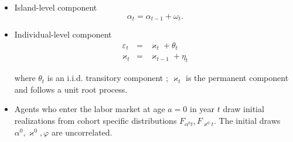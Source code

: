 \documentclass[notes=show]{beamer}
\begin{document}
\begin{frame}%



\begin{itemize}
\item Island-level component%
\begin{equation}
\alpha _{t}=\alpha _{t-1}+\omega _{t}.
\end{equation}

\item Individual-level component%
\begin{eqnarray}
\varepsilon _{t} &=&\varkappa _{t}+\theta _{t} \\
\varkappa _{t} &=&\varkappa _{t-1}+\eta _{t}
\end{eqnarray}

where $\theta _{t}$ is an i.i.d. transitory component ; $\varkappa _{t}$ is
the permanent component and follows a unit root process.

\item Agents who enter the labor market at age $a=0$ in year $t$ draw
initial realizations from cohort specific distributions $F_{\alpha
^{0}t},F_{\varkappa ^{0}t}$. The initial draws $\alpha ^{0},\varkappa
^{0},\varphi $ are uncorrelated.
\end{itemize}

\transboxout%
\end{frame}%

\bigskip
\end{document}
